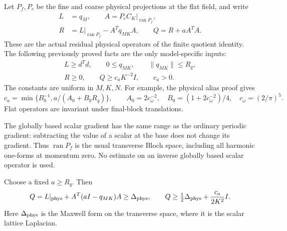 \documentclass[11pt]{article}
\theoremstyle{remark}
\begin{document}
Let \(P_f,P_c\) be the fine and coarse physical projections at
the flat field, and write
\begin{equation}
 \begin{split}
 L&=q_M,\qquad A=P_cC_K|_{\operatorname{ran}P_f},\\
 R&=L|_{\operatorname{ran}P_f}-A^Tq_{MK}A,\qquad
 Q=R+aA^TA .
 \end{split}
 \label{pvs-operators}
\end{equation}
These are the actual residual physical operators of the finite
quotient identity. The following previously proved facts are the
only model-specific inputs:
\begin{equation}
 \begin{gathered}
 L\ge d^Td,\qquad 0\le q_{MK},\qquad \|q_{MK}\|\le R_q,\\
 R\ge0,\qquad Q\ge c_aK^{-2}I,\qquad c_a>0 .
 \end{gathered}
 \label{pvs-inputs}
\end{equation}
The constants are uniform in \(M,K,N\).
For example, the physical alias proof gives
\[
 c_a=\min\{B_0^{-1},a/(A_0+B_0R_q)\},\qquad
 A_0=2c_\omega^{-2},\quad
 B_0=(1+2c_\omega^{-2})/4,\quad c_\omega=(2/\pi)^5.
\]
Flat operators are invariant under final-block translations.

The globally based scalar gradient has the same range as the
ordinary periodic gradient: subtracting the value of a scalar at
the base does not change its gradient.
Thus \(\operatorname{ran}P_f\) is the usual transverse Bloch
space, including all harmonic one-forms at momentum zero.
No estimate on an inverse globally based scalar operator is used.

Choose a fixed \(a\ge R_q\). Then
\begin{equation}
 Q=L|_{\rm phys}+A^T(aI-q_{MK})A\ge\Delta_{\rm phys},
 \qquad
 Q\ge\tfrac12\Delta_{\rm phys}+\frac{c_a}{2K^2}I .
 \label{pvs-combined-order}
\end{equation}
Here \(\Delta_{\rm phys}\) is the Maxwell form on the transverse
space, where it is the scalar lattice Laplacian.
\end{document}
